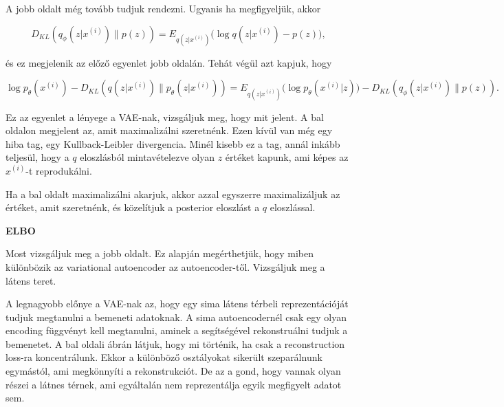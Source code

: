 \documentclass[12pt]{amsart}
\begin{document}
\vspace{5pt}

A jobb oldalt még tovább tudjuk rendezni. Ugyanis ha
megfigyeljük, akkor 

\[
  D_{KL}(q_{\phi}(z| x^{(i)})\| p(z)) =
  E_{q(z|x^{(i)})}\Big( \log q(z|x^{(i)}) - p(z) \Big),
\]

\vspace{5pt}

és ez megjelenik az előző egyenlet jobb oldalán. Tehát végül
azt kapjuk, hogy

\[
  \log p_{\theta}(x^{(i)}) - D_{KL}(q(z| x^{(i)}) \|
  p_\theta(z| x^{(i)})) = E_{q(z|x^{(i)})}\Big( \log
  p_{\theta}(x^{(i)}| z)\Big) - D_{KL}(q_{\phi}(z|
  x^{(i)})\| p(z)). 
\]

\vspace{5pt}

Ez az egyenlet a lényege a VAE-nak, vizsgáljuk meg, hogy mit
jelent. A bal oldalon megjelent az, amit maximalizálni
szeretnénk. Ezen kívül van még egy hiba tag, egy
Kullback-Leibler divergencia. Minél kisebb ez a tag, annál
inkább teljesül, hogy a $q$ eloszlásból mintavételezve olyan
$z$ értéket kapunk, ami képes az $x^{(i)}$-t reprodukálni.

\vspace{5pt}

Ha a bal oldalt maximalizálni akarjuk, akkor azzal egyszerre
maximalizáljuk az értéket, amit szeretnénk, és közelítjuk a
posterior eloszlást a $q$ eloszlással.

\vspace{10pt}

\textbf{ELBO}

\vspace{10pt}

Most vizsgáljuk meg a jobb oldalt. Ez alapján megérthetjük,
hogy miben különbözik az variational autoencoder az
autoencoder-től. Vizsgáljuk meg a látens teret.

\vspace{5pt}

A legnagyobb előnye a VAE-nak az, hogy egy sima látens
térbeli reprezentációját tudjuk megtanulni a bemeneti
adatoknak. A sima autoencodernél csak egy olyan encoding
függvényt kell megtanulni, aminek a segítségével
rekonstruálni tudjuk a bemenetet. A bal oldali ábrán látjuk,
hogy mi történik, ha csak a reconstruction loss-ra
koncentrálunk. Ekkor a különböző osztályokat sikerült
szeparálnunk egymástól, ami megkönnyíti a rekonstrukciót. De
az a gond, hogy vannak olyan részei a látnes térnek, ami
egyáltalán nem reprezentálja egyik megfigyelt adatot sem.
\end{document}
